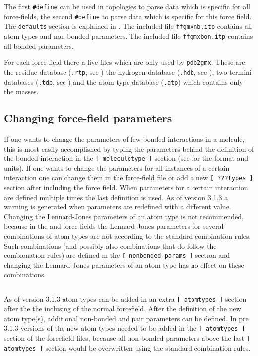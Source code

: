 The first {\tt \#define} can be used in topologies to parse data which is
specific for all {\gromacs} force-fields, the second {\tt \#define} to parse
data which is specific for this force field. The {\tt defaults} section is
explained in . The included file {\tt ffgmxnb.itp} contains
all atom types and non-bonded parameters. The included file {\tt ffgmxbon.itp}
contains all bonded parameters.

For each force field there a five files which are only used by {\tt pdb2gmx}.
These are: the residue database ({\tt .rtp}, see )
the hydrogen database ({\tt .hdb}, see ), two termini databases
({\tt .tdb}, see ) and
the atom type database ({\tt .atp}) which contains only the masses.


\subsection{Changing force-field parameters
}
If one wants to change the parameters of few bonded interactions in
a molcule, this is most easily accomplished by typing the parameters
behind the definition of the bonded interaction in the
{\tt [ moleculetype ]} section (see  for the format
and units).
If one wants to change the parameters for all instances of a certain
interaction one can change them in the force-field file or add a
new {\tt [ ???types ]} section after including the force field.
When parameters for a certain interaction are defined multiple times
the last definition is used. As of {\gromacs} version 3.1.3 a warning is
generated when parameters are redefined with a different value.
Changing the Lennard-Jones parameters of an atom type is not
recommended, because in the {\gromacs} and {\gromos} force-fields
the Lennard-Jones parameters for several combinations of atom types
are not according to the standard combination rules.
Such combinations (and possibly also combinations that do follow the
combionation rules) are defined in the {\tt [ nonbonded\_params ]}
section and changing the Lennard-Jones parameters of an atom type
has no effect on these combinations.

\subsection{}
As of {\gromacs} version 3.1.3 atom types can be added in an extra
{\tt [ atomtypes ]} section after the the inclusing of the normal
forcefield. After the definition of the new atom type(s), additional
non-bonded and pair parameters can be defined.
In pre 3.1.3 versions of {\gromacs} the new atom types needed to be
added in the {\tt [ atomtypes ]} section of the forcefield files,
because all non-bonded parameters above the last {\tt [ atomtypes ]}
section would be overwritten using the standard combination rules.

